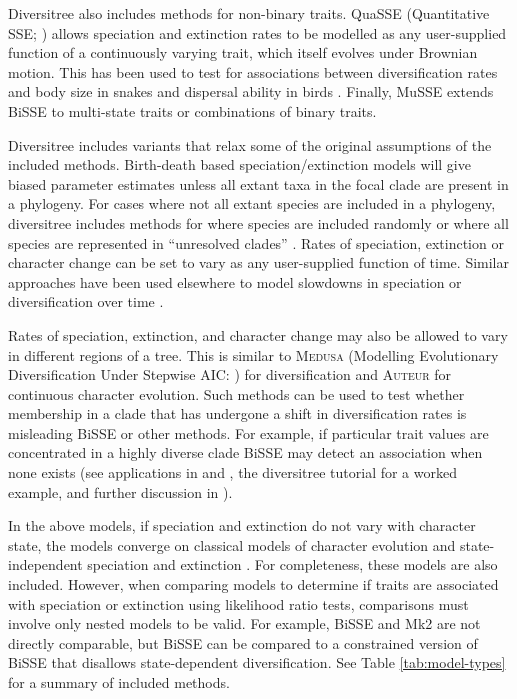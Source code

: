 \documentclass[12pt]{article}
\begin{document}
Diversitree also includes methods for non-binary traits.  %
QuaSSE (Quantitative SSE; \citealp{FitzJohn-2010-619}) allows
speciation and extinction rates to be modelled as any user-supplied
function of a continuously varying trait, which itself evolves under
Brownian motion.  This has been used to test for associations between
diversification rates and body size in snakes
\citep{Burbrink-2012-465} and dispersal ability in birds
\citep{Claramunt-2012-1567}.
%
Finally, MuSSE extends BiSSE to multi-state traits or combinations of
binary traits.

Diversitree includes variants that relax some of the original
assumptions of the included methods.
%
Birth-death based speciation/extinction models will give biased
parameter estimates unless all extant taxa in the focal clade are
present in a phylogeny.  For cases where not all extant species are
included in a phylogeny, diversitree includes methods
%
for where species are included randomly or where all species are
represented in ``unresolved clades'' \citep{FitzJohn-2009-595}.
%
Rates of speciation, extinction or character change can be set to vary
as any user-supplied function of time.  Similar approaches have been
used elsewhere to model slowdowns in speciation or diversification
over time \citep[e.g.,][]{Rabosky-2010-22178}.

Rates of speciation, extinction, and character change may also be
allowed to vary in different regions of a tree.
%
This is similar to \textsc{Medusa} (Modelling Evolutionary
Diversification Under Stepwise AIC: \citealp{Alfaro-2009-13410}) for
diversification and \textsc{Auteur} \citep{Eastman-2011-3578} for
continuous character evolution.
%
Such methods can be used to test whether membership in a clade that
has undergone a shift in diversification rates is misleading BiSSE or
other methods.  For example, if particular trait values are
concentrated in a highly diverse clade BiSSE may detect an association
when none exists (see applications in \citealp{Johnson-2011-3230} and
\citealp{FitzJohn-2010-619}, the diversitree tutorial for a worked
example, and further discussion in \citealp{Read-1995-99}).

In the above models, if speciation and extinction do not vary with
character state, the models converge on classical models of character
evolution \citep[e.g.,][]{Pagel-1994-37} and state-independent
speciation and extinction \citep{Nee-1994-305}.  For completeness,
these models are also included.
%
However, when comparing models to determine if traits are associated
with speciation or extinction using likelihood ratio tests,
comparisons must involve only nested models to be valid.  For example,
BiSSE and Mk2 are not directly comparable, but BiSSE can be compared
to a constrained version of BiSSE that disallows state-dependent
diversification.
%
See Table \ref{tab:model-types} for a summary of included methods.
\end{document}
